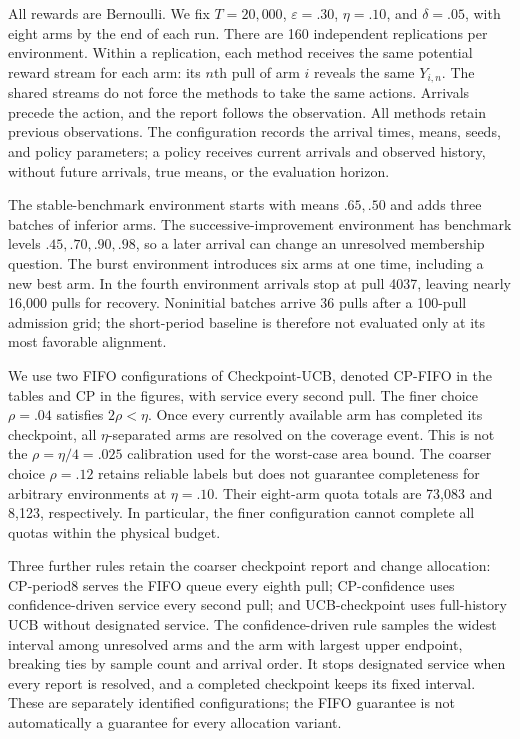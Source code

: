 \documentclass[11pt]{article}
\begin{document}
All rewards are Bernoulli. We fix $T=20{,}000$, $\varepsilon=.30$,
$\eta=.10$, and $\delta=.05$, with eight arms by the end of each run.
There are 160 independent replications per environment. Within a replication,
each method receives the same potential reward stream for each arm: its
$n$th pull of arm $i$ reveals the same $Y_{i,n}$. The shared streams do not
force the methods to take the same actions. Arrivals precede the action,
and the report follows the observation. All methods retain previous
observations. The configuration records the arrival times, means, seeds,
and policy parameters; a policy receives current arrivals and observed
history, without future arrivals, true means, or the evaluation horizon.

The stable-benchmark environment starts with means $.65,.50$ and adds three
batches of inferior arms. The successive-improvement environment has
benchmark levels $.45,.70,.90,.98$, so a later arrival can change an
unresolved membership question. The burst environment introduces six arms
at one time, including a new best arm. In the fourth environment arrivals
stop at pull 4037, leaving nearly 16,000 pulls for recovery. Noninitial
batches arrive 36 pulls after a 100-pull admission grid; the short-period
baseline is therefore not evaluated only at its most favorable alignment.

We use two FIFO configurations of Checkpoint-UCB, denoted CP-FIFO in the
tables and CP in the figures, with service every second pull. The finer
choice $\rho=.04$ satisfies $2\rho<\eta$. Once every currently available
arm has completed its checkpoint, all $\eta$-separated arms are resolved
on the coverage event. This is not the
$\rho=\eta/4=.025$ calibration used for the worst-case area bound.
The coarser choice $\rho=.12$ retains reliable labels but does not guarantee
completeness for arbitrary environments at $\eta=.10$. Their eight-arm
quota totals are 73,083 and 8,123, respectively. In particular, the finer
configuration cannot complete all quotas within the physical budget.

Three further rules retain the coarser checkpoint report and change
allocation: CP-period8 serves the FIFO queue every eighth pull;
CP-confidence uses confidence-driven service every second pull; and
UCB-checkpoint uses full-history UCB without designated service. The
confidence-driven rule samples the widest interval among unresolved arms
and the arm with largest upper endpoint, breaking ties by sample count and
arrival order. It stops designated service when every report is resolved,
and a completed checkpoint keeps its fixed interval. These are separately
identified configurations; the FIFO guarantee is not automatically a
guarantee for every allocation variant.
\end{document}
